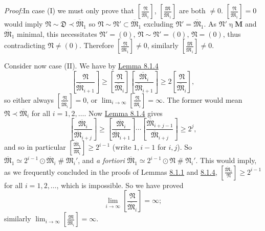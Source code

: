 \documentclass[12pt,b5paper,twoside]{article}
\newcommand{\M}{\mathbf M}
\newcommand{\reldiv}[2]{\left[\frac{#1}{#2}\right]}
\newcommand{\Proof}{\par\noindent\textit{Proof:}\enspace}
\newcommand{\lemref}[1]{\hyperref[lem:#1]{Lemma #1}}
\begin{document}
\Proof In case (I) we must only prove that
$\reldiv{\mathfrak N}{\overline{\mathfrak M}_1}$,
$\reldiv{\mathfrak M}{\overline{\mathfrak M}_1}$ are both $\ne0$.
$\reldiv{\mathfrak N}{\overline{\mathfrak M}_1}=0$ would imply
$\mathfrak N\sim\mathfrak D\prec\overline{\mathfrak M}_1$ so
$\mathfrak N\sim\mathfrak N'\subset\overline{\mathfrak M}_1$ excluding
$\mathfrak N'=\overline{\mathfrak M}_1$. As
$\mathfrak N'\mathbin\eta\M$ and $\overline{\mathfrak M}_1$ minimal, this
necessitates $\mathfrak N'=(0)$, $\mathfrak N\sim\mathfrak N'=(0)$,
$\mathfrak N=(0)$, thus contradicting $\mathfrak N\ne(0)$. Therefore
$\reldiv{\mathfrak N}{\overline{\mathfrak M}_1}\ne0$, similarly
$\reldiv{\mathfrak M}{\overline{\mathfrak M}_1}\ne0$.

Consider now case (II). We have by \lemref{8.1.4}
\[
 \reldiv{\mathfrak N}{\overline{\mathfrak M}_{i+1}}
 \geq\reldiv{\mathfrak N}{\overline{\mathfrak M}_i}
       \reldiv{\overline{\mathfrak M}_i}{\overline{\mathfrak M}_{i+1}}
 \geq2\reldiv{\mathfrak N}{\overline{\mathfrak M}_i},
\]
so either always $\reldiv{\mathfrak N}{\overline{\mathfrak M}_i}=0$, or
$\lim_{i\to\infty}\reldiv{\mathfrak N}{\overline{\mathfrak M}_i}=\infty$.
The former would mean $\mathfrak N\prec\overline{\mathfrak M}_i$ for all
$i=1,2,\ldots$. Now \lemref{8.1.4} gives
\[
 \reldiv{\overline{\mathfrak M}_i}{\overline{\mathfrak M}_{i+j}}
 \geq
 \reldiv{\overline{\mathfrak M}_i}{\overline{\mathfrak M}_{i+1}}
 \cdots
 \reldiv{\overline{\mathfrak M}_{i+j-1}}{\overline{\mathfrak M}_{i+j}}
 \geq2^j,
\]
and so in particular
$\reldiv{\overline{\mathfrak M}_1}{\overline{\mathfrak M}_i}\geq2^{i-1}$
(write $1,i-1$ for $i,j$). So
$\overline{\mathfrak M}_1\simeq2^{i-1}\odot\overline{\mathfrak M}_i
\mathbin{\#}\mathfrak M_i'$, and \emph{a fortiori}
$\overline{\mathfrak M}_1\simeq2^{i-1}\odot\mathfrak N
\mathbin{\#}\mathfrak N_i'$. This would imply, as we frequently concluded in
the proofs of Lemmas \hyperref[lem:8.1.1]{8.1.1} and
\hyperref[lem:8.1.4]{8.1.4},
$\reldiv{\overline{\mathfrak M}_1}{\mathfrak N}\geq2^{i-1}$ for all
$i=1,2,\ldots$, which is impossible. So we have proved
\[
 \lim_{i\to\infty}\reldiv{\mathfrak N}{\overline{\mathfrak M}_i}=\infty;
\]
similarly
$\lim_{i\to\infty}\reldiv{\mathfrak M}{\overline{\mathfrak M}_i}=\infty$.
\end{document}
